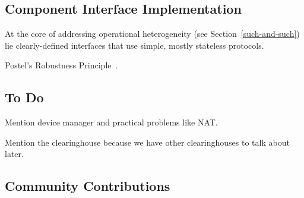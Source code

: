 \subsection{Component Interface Implementation}

At the core of addressing operational heterogeneity (see
Section~\ref{such-and-such}) lie clearly-defined interfaces
that use simple, mostly stateless protocols.

Postel's Robustness Principle~\cite[\S2.10]{rfc793}.


\subsection{To Do}

Mention device manager and practical problems like NAT.

Mention the clearinghouse because we have other clearinghouses
to talk about later.

\subsection{Community Contributions}

